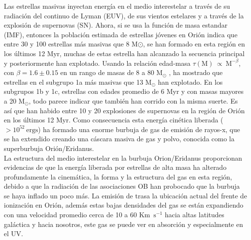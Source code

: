 Las estrellas masivas inyectan energía en el medio interestelar a través de su radiación del continuo de Lyman (EUV), de sus vientos estelares y a través de la explosión de supernovas (SN). Ahora, si se usa la función de masa estandar (IMF), entonces la población estimada de estrellas jóvenes en Orión indica que entre 30 y 100 estrellas más masivas que 8 M\(\odot\), se han formado en esta región en los últimos 12 Myr, muchas de estas estrella han alcanzado la secuencia principal y posteriormente han explotado. Usando la relación edad-masa \(\tau(\text{M})~\propto~\text{M}^{-\beta}\), con \(\beta = 1.6 \pm 0.15\) en un rango de masas de 8 a 80 \(\text{M}_{\odot}\) \citep{Shull:1995}, ha mostrado que estrellas en el subgrupo 1a más masivas que 13 \(\text{M}_{\odot}\) han explotado. En los subgrupos 1b y 1c, estrellas con edades promedio de 6 Myr y con masas mayores a 20 \(\text{M}_{\odot}\), todo parece indicar que también han corrido con la misma suerte. Es así que han habido entre 10 y 20 explosiones de supernovas en la región de Orión en los últimos 12 Myr. Como consecuencia esta energía cinética liberada (\(>10^{52}~\text{ergs}\)) ha formado una enorme burbuja de gas de emisión de rayos-x, que se ha extendido creando una cáscara masiva de gas y polvo, conocida como la superburbuja Orión/Eridanus.\\

La estructura del medio interestelar en la  burbuja Orion/Eridanus proporcionan evidencias de que la energía liberada por estrellas de alta masa ha alterado profundamente la cinemática, la forma y la estructura del gas en esta región, debido a que la radiación de las asociaciones OB han probocado que la burbuja se haya inflado un poco más. La emisión de \ha{} trasa la ubicación actual del frente de ionización en Orión, además estas bajas densidades del gas se están expandiendo con una velocidad promedio cerca de 10 a 60 Km~\(\text{s}^{-1}\) hacia altas latitudes galáctica y hacia nosotros, este gas se puede ver en absorción y especialmente en el UV.\\
         
